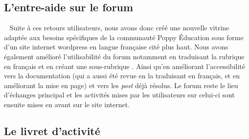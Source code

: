     \subsection{L'entre-aide sur le forum}
       ~
        Suite à ces retours utilisateurs, nous avons donc créé une nouvelle vitrine adaptée aux besoins spécifiques de la communauté Poppy Éducation sous forme d'un site internet wordpress en langue française cité plus haut. %
        Nous avons également amélioré l'utilisabilité du forum notamment en traduisant la rubrique  en français et en créant une sous-rubrique . Ainsi qu'en améliorant l'accessibilité vers la documentation (qui a aussi été revue \eg en la traduisant en français, et en améliorant la mise en page) et vers les \textit{post} déjà résolus.
        Le forum reste le lieu d'échanges principal et les activités mises par les utilisateurs sur celui-ci sont ensuite mises en avant sur le site internet. %
    \subsection{Le livret d'activité}
